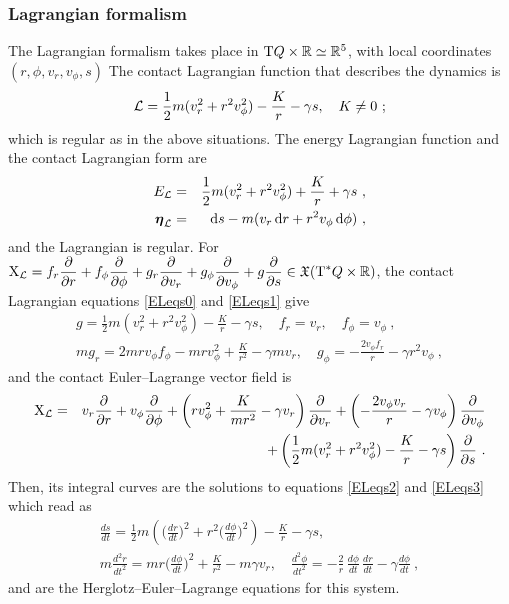 \documentclass[12pt]{report}
\def\bea{\begin{eqnarray}}
\def\eea{\end{eqnarray}}
\def\beann{\begin{eqnarray*}}
\def\eeann{\end{eqnarray*}}
\def\dst{\displaystyle}
\def\derpar#1#2{\frac{\partial{#1}}{\partial{#2}}}
\def\vf{\mathfrak X}
\def\Lag{{\cal L}}
\def\d{{\rm d}}
\def\Real{\mathbb{R}}
\def\bmeta{\mbox{\boldmath $\eta$}}
\def\X{{\rm X}}
\def\Tan{{\rm T}}
\begin{document}
\subsubsection{Lagrangian formalism}

The Lagrangian formalism takes place in $\Tan Q\times\Real\simeq\Real^5$, with local coordinates 
$(r,\phi,v_r,v_\phi,s)$
The contact Lagrangian function that describes the dynamics is
$$
\Lag=\frac{1}{2}m(v_r^2+r^2v_\phi^2)-\frac{K}{r}-\gamma s ,\quad K\not=0 \ ;
$$
which is regular as in the above situations.
The energy Lagrangian function and the contact Lagrangian form are
\beann
E_\Lag&=&\frac{1}{2}m(v_r^2+r^2v_\phi^2)+\frac{K}{r}+\gamma s \ , \\
\bmeta_\Lag&=&\d s-m(v_r\,\d r+r^2v_\phi\,\d\phi) \ , 
\eeann
and the Lagrangian is regular.
For $\displaystyle \X_\Lag=f_r\derpar{}{r}+f_\phi\derpar{}{\phi}+
g_r\derpar{}{v_r}+g_\phi\derpar{}{v_\phi}+g\derpar{}{s}\in\vf(\Tan^*Q\times \Real)$, 
the contact Lagrangian equations \eqref{ELeqs0}
and \eqref{ELeqs1} give
\beann
g=\frac{1}{2}m(v_r^2+r^2v_\phi^2)-\frac{K}{r}-\gamma s ,\quad
f_r=v_r ,\quad f_\phi=v_\phi \ , \\ 
mg_r=2mrv_\phi f_\phi-mrv_\phi^2+\frac{K}{r^2}-\gamma mv_r ,\quad 
g_\phi=-\frac{2v_\phi f_r}{r}-\gamma r^2v_\phi   \ ,
\eeann
and the contact Euler--Lagrange vector field is
\beann
\X_\Lag&=&v_r\derpar{}{r}+v_\phi\derpar{}{\phi}+\left(rv_\phi^2+\dst\frac{K}{mr^2}-\gamma v_r\right)\derpar{}{v_r}
+\left(-\frac{2v_\phi v_r}{r}-\gamma v_\phi\right)\derpar{}{v_\phi} \\
& & +
\left(\frac{1}{2}m(v_r^2+r^2v_\phi^2)-\frac{K}{r}-\gamma s\right)\derpar{}{s}\ .
\eeann
Then, its integral curves are the solutions to equations \eqref{ELeqs2} and \eqref{ELeqs3} which read as
\bea
\frac{ds}{dt}=\frac{1}{2}m\left(\Big(\frac{dr}{dt}\Big)^2+r^2\Big(\frac{d\phi}{dt}\Big)^2\right)-\frac{K}{r}-\gamma s ,\quad
\nonumber \\
 m\frac{d^2r}{dt^2}=mr\Big(\frac{d\phi}{dt}\Big)^2+\frac{K}{r^2}-m\gamma v_r  
,\quad  \frac{d^2\phi}{dt^2}=
-\frac{2}{r}\,\frac{d\phi}{dt}\,\frac{dr}{dt}-\gamma \frac{d\phi}{dt} \ ,
\label{eqEL-M}
\eea
and are the Herglotz--Euler--Lagrange equations for this system.
\end{document}
